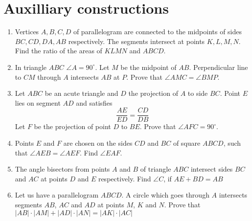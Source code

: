 \documentclass{article}
\begin{document}
\section{Auxilliary constructions} %
\begin{enumerate}[resume]
  \item
  Vertices $A,B,C,D$ of parallelogram are connected to the midpoints of sides $BC,CD,DA,AB$ respectively. The segments intersect at points $K,L,M,N$. Find the ratio of the areas of $KLMN$ and $ABCD$.

  \item
  In triangle $ABC$ $\angle A = 90 ^\circ$. Let $M$ be the midpoint of $AB$. Perpendicular line to $CM$ through $A$ intersects $AB$ at $P$. Prove that $\angle AMC = \angle BMP$.

  \item
    Let $ABC$ be an acute triangle and $D$ the projection of $A$ to side $BC$. Point $E$ lies on segment $AD$ and satisfies
    $$\frac{AE}{ED}=\frac{CD}{DB}$$
    Let $F$ be the projection of point $D$ to $BE$. Prove that $\angle AFC = 90 ^\circ$.
  \item
  Points $E$ and $F$ are chosen on the sides $CD$ and $BC$ of square $ABCD$, such that $\angle AEB = \angle AEF$. Find $\angle EAF$.
  \item
  The angle bisectors from points $A$ and $B$ of triangle $ABC$ intersect sides $BC$ and $AC$ at points $D$ and $E$ respectively. Find $\angle C$, if $AE + BD = AB$

  \item
  Let us have a parallelogram $ABCD$. A circle which goes through $A$ intersects segments $AB$, $AC$ and $AD$ at points $M$, $K$ and $N$. Prove that $|AB|\cdot|AM| + |AD|\cdot |AN| = |AK|\cdot|AC|$

\end{enumerate}
\end{document}
